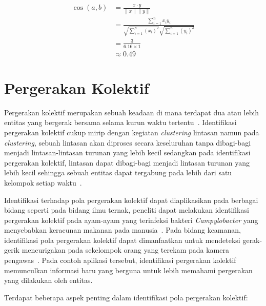 \vspace{-7.5pt}

\begin{align*}
    \cos (a, b) & = \frac{x \cdot y}{\|x\| \|y\|} \\
    & = \frac{ \sum_{i=1}^{n}{x_i y_i}}{ \sqrt{\sum_{i=1}^{n}{(x_i)^2}} \sqrt{\sum_{i=1}^{n}{(y_i)^2}}} \\
    & = \frac{3}{6.16 \times 1} \\
    & \approx 0.49
\end{align*}

\section{Pergerakan Kolektif}
\label{sec:collective-movement}

Pergerakan kolektif merupakan sebuah keadaan di mana terdapat dua atau lebih entitas yang bergerak bersama selama kurun waktu tertentu~\cite{wiratma:trajectory}. Identifikasi pergerakan kolektif cukup mirip dengan kegiatan \textit{clustering} lintasan namun pada \textit{clustering}, sebuah lintasan akan diproses secara keseluruhan tanpa dibagi-bagi menjadi lintasan-lintasan turunan yang lebih kecil sedangkan pada identifikasi pergerakan kolektif, lintasan dapat dibagi-bagi menjadi lintasan turunan yang lebih kecil sehingga sebuah entitas dapat tergabung pada lebih dari satu kelompok setiap waktu~\cite{wiratma:trajectory}.

Identifikasi terhadap pola pergerakan kolektif dapat diaplikasikan pada berbagai bidang seperti pada bidang ilmu ternak, peneliti dapat melakukan identifikasi pergerakan kolektif pada ayam-ayam yang terinfeksi bakteri \textit{Campylobacter} yang menyebabkan keracunan makanan pada manusia~\cite{colles:02:chicken}. Pada bidang keamanan, identifikasi pola pergerakan kolektif dapat dimanfaatkan untuk mendeteksi gerak-gerik mencurigakan pada sekelompok orang yang terekam pada kamera pengawas~\cite{makris:01:security}. Pada contoh aplikasi tersebut, identifikasi pergerakan kolektif memunculkan informasi baru yang berguna untuk lebih memahami pergerakan yang dilakukan oleh entitas.

\noindent Terdapat beberapa aspek penting dalam identifikasi pola pergerakan kolektif:

